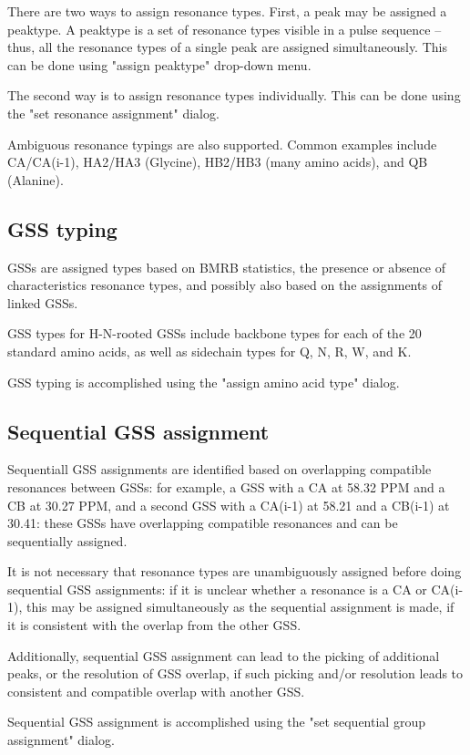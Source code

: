 There are two ways to assign resonance types.  First, a peak may be assigned
a peaktype.  A peaktype is a set of resonance types visible in a pulse sequence
-- thus, all the resonance types of a single peak are assigned simultaneously.
This can be done using "assign peaktype" drop-down menu.

The second way is to assign resonance types individually.  This can be done 
using the "set resonance assignment" dialog.

Ambiguous resonance typings are also supported.  Common examples include
CA/CA(i-1), HA2/HA3 (Glycine), HB2/HB3 (many amino acids), and QB (Alanine).

\subsection{GSS typing}
GSSs are assigned types based on BMRB statistics, the presence or absence of
characteristics resonance types, and possibly also based on the assignments 
of linked GSSs.

GSS types for H-N-rooted GSSs include backbone types for each of the 20 
standard amino acids, as well as sidechain types for Q, N, R, W, and K.

GSS typing is accomplished using the "assign amino acid type" dialog.

\subsection{Sequential GSS assignment}
Sequentiall GSS assignments are identified based on overlapping compatible
resonances between GSSs: for example, a GSS with a CA at 58.32 PPM and a CB
at 30.27 PPM, and a second GSS with a CA(i-1) at 58.21 and a CB(i-1) at 30.41:
these GSSs have overlapping compatible resonances and can be sequentially
assigned.

It is not necessary that resonance types are unambiguously assigned before
doing sequential GSS assignments: if it is unclear whether a resonance is a
CA or CA(i-1), this may be assigned simultaneously as the sequential assignment
is made, if it is consistent with the overlap from the other GSS.

Additionally, sequential GSS assignment can lead to the picking of additional
peaks, or the resolution of GSS overlap, if such picking and/or resolution
leads to consistent and compatible overlap with another GSS.

Sequential GSS assignment is accomplished using the "set sequential group
assignment" dialog.


